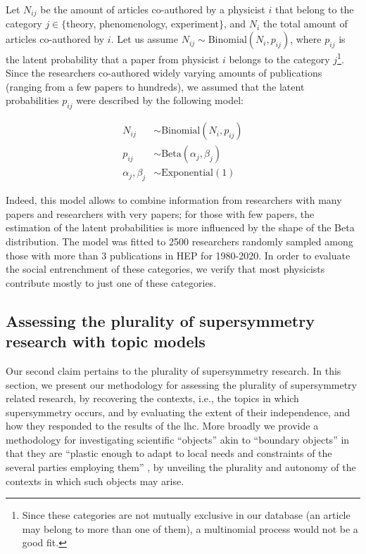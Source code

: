 \documentclass[smallextended]{svjour3}
\begin{document}
Let $N_{ij}$ be the amount of articles co-authored by a physicist $i$ that belong to the category $j \in \{$theory, phenomenology, experiment$\}$, and $N_i$ the total amount of articles co-authored by $i$. Let us assume $N_{ij} \sim \mathrm{Binomial}(N_i, p_{ij})$, where $p_{ij}$ is the latent probability that a paper from physicist $i$ belongs to the category $j$\footnote{Since these categories are not mutually exclusive in our database (an article may belong to more than one of them), a multinomial process would not be a good fit.}. Since the researchers co-authored widely varying amounts of publications (ranging from a few papers to hundreds), we assumed that the latent probabilities $p_{ij}$ were described by the following model:

\begin{align*}
    N_{ij} &\sim \mathrm{Binomial}(N_i, p_{ij})\\
    p_{ij} &\sim \mathrm{Beta}(\alpha_j, \beta_j) \\
    \alpha_j,\beta_j &\sim \mathrm{Exponential}(1)
\end{align*}

Indeed, this model allows to combine information from researchers with many papers and researchers with very papers; for those with few papers, the estimation of the latent probabilities is more influenced by the shape of the Beta distribution. The model was fitted to 2500 researchers randomly sampled among those with more than 3 publications in HEP for 1980-2020. In order to evaluate the social entrenchment of these categories, we verify that most physicists contribute mostly to just one of these categories.

\subsection{Assessing the plurality of supersymmetry research with topic models}\label{section:method_plurality}

Our second claim pertains to the plurality of supersymmetry research. In this section, we present our methodology for assessing the plurality of supersymmetry related research, by recovering the contexts, i.e., the topics in which supersymmetry occurs, and by evaluating the extent of their independence, and how they responded to the results of the \gls{lhc}. More broadly we provide a methodology for investigating scientific ``objects'' akin to ``boundary objects'' in that they are ``plastic enough to adapt to local needs and constraints of the several parties employing them'' \citep[p.~393]{Star1989}, by unveiling the plurality and autonomy of the contexts in which such objects may arise.
\end{document}
